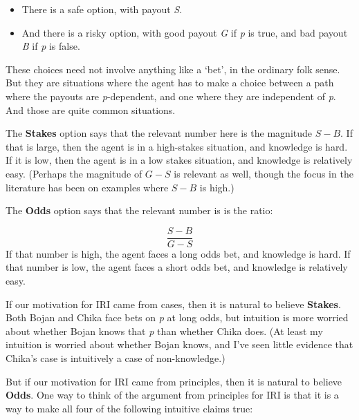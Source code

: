\documentclass[11pt,oneside]{book}
\begin{document}
\begin{itemize}
\item There is a safe option, with payout \emph{S}.

\item And there is a risky option, with good payout \emph{G} if \emph{p} is true, and bad payout \emph{B} if \emph{p} is false.

\end{itemize}
These choices need not involve anything like a `bet', in the ordinary folk sense. But they are situations where the agent has to make a choice between a path where the payouts are \emph{p}-dependent, and one where they are independent of \emph{p}. And those are quite common situations. 

The \textbf{Stakes} option says that the relevant number here is the magnitude $S-B$. If that is large, then the agent is in a high-stakes situation, and knowledge is hard. If it is low, then the agent is in a low stakes situation, and knowledge is relatively easy. (Perhaps the magnitude of $G-S$ is relevant as well, though the focus in the literature has been on examples where $S-B$ is high.)

The \textbf{Odds} option says that the relevant number is is the ratio:

$$\frac{S-B}{G-S}$$
If that number is high, the agent faces a long odds bet, and knowledge is hard. If that number is low, the agent faces a short odds bet, and knowledge is relatively easy.

If our motivation for IRI came from cases, then it is natural to believe \textbf{Stakes}. Both Bojan and Chika face bets on \emph{p} at long odds, but intuition is more worried about whether Bojan knows that \emph{p} than whether Chika does. (At least my intuition is worried about whether Bojan knows, and I've seen little evidence that Chika's case is intuitively a case of non-knowledge.)

But if our motivation for IRI came from principles, then it is natural to believe \textbf{Odds}. One way to think of the argument from principles for IRI is that it is a way to make all four of the following intuitive claims true:
\end{document}

